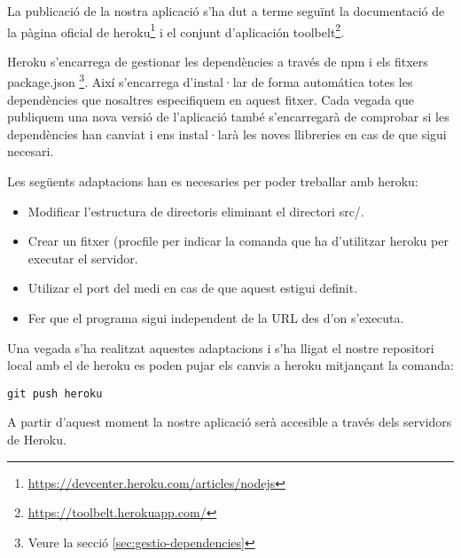 La publicació de la nostra aplicació s'ha dut a terme seguïnt la documentació de la pàgina oficial de heroku\footnote{\url{https://devcenter.heroku.com/articles/nodejs}} i el conjunt d'aplicación toolbelt\footnote{\url{https://toolbelt.herokuapp.com/}}. 

Heroku s'encarrega de gestionar les dependències a través de npm i els fitxers package.json \footnote{Veure la secció \ref{sec:gestio-dependencies}}. Així s'encarrega d'instal·lar de forma automática totes les dependències que nosaltres especifiquem en aquest fitxer. Cada vegada que publiquem una nova versió de l'aplicació també s'encarregarà de comprobar si les dependències han canviat i ens instal·larà les noves llibreries en cas de que sigui necesari. 

Les següents adaptacions han es necesaries per poder treballar amb heroku: 

\begin{itemize}
\item{Modificar l'estructura de directoris eliminant el directori src/.}
\item{Crear un fitxer (procfile per indicar la comanda que ha d'utilitzar heroku per executar el servidor.}
\item{Utilizar el port del medi en cas de que aquest estigui definit. }
\item{Fer que el programa sigui independent de la URL des d'on s'executa.}
\end{itemize}

Una vegada s'ha realitzat aquestes adaptacions i s'ha lligat el nostre repositori local amb el de heroku es poden pujar els canvis a heroku mitjançant la comanda: 

\begin{verbatim}
git push heroku
\end{verbatim}

A partir d'aquest moment la nostre aplicació serà accesible a través dels servidors de Heroku.


